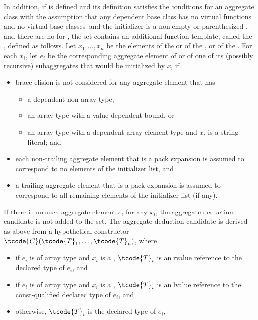 In addition, if  is defined
and its definition satisfies the conditions for
an aggregate class
with the assumption that any dependent base class has
no virtual functions and no virtual base classes, and
the initializer is a non-empty  or
parenthesized , and
there are no  for ,
the set contains an additional function template,
called the , defined as follows.
Let $x_1, \dotsc, x_n$ be the elements
of the  or
of the , or
of the .
For each $x_i$, let $e_i$ be the corresponding aggregate element
of  or of one of its (possibly recursive) subaggregates
that would be initialized by $x_i$ if
\begin{itemize}
\item
brace elision is not considered for any aggregate element
that has
\begin{itemize}
\item a dependent non-array type,
\item an array type with a value-dependent bound, or
\item an array type with a dependent array element type and $x_i$ is a string literal; and
\end{itemize}
\item
each non-trailing aggregate element that is a pack expansion
is assumed to correspond to no elements of the initializer list, and
\item
a trailing aggregate element that is a pack expansion is assumed to correspond
to all remaining elements of the initializer list (if any).
\end{itemize}
If there is no such aggregate element $e_i$ for any $x_i$,
the aggregate deduction candidate is not added to the set.
The aggregate deduction candidate is derived as above
from a hypothetical constructor $\tcode{C}(\tcode{T}_1, \dotsc, \tcode{T}_n)$,
where
\begin{itemize}
\item
if $e_i$ is of array type and
$x_i$ is a ,
$\tcode{T}_i$ is an rvalue reference to the declared type of $e_i$, and
\item
if $e_i$ is of array type and
$x_i$ is a ,
$\tcode{T}_i$ is an lvalue reference to
the const-qualified declared type of $e_i$, and
\item
otherwise, $\tcode{T}_i$ is the declared type of $e_i$,
\end{itemize}
